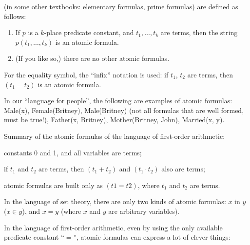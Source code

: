  (in some other textbooks: elementary formulas, prime formulas) are defined as follows:

\begin{enumerate}
    \item If \(p\) is a \(k\)-place predicate constant, and \(t_1, \ldots , t_k\) are terms, then the string \(p(t_1, \ldots , t_k)\) is an atomic formula.
    \item (If you like so,) there are no other atomic formulas.
\end{enumerate}
For the equality symbol, the ``infix'' notation is used: if \(t_1\), \(t_2\) are terms, then \((t_1=t_2)\) is an atomic formula.

\begin{example}
In our ``language for people'', the following are examples of atomic formulas: Male(x), Female(Britney), Male(Britney) (not all formulas that are well formed, must be true!), Father(x, Britney), Mother(Britney, John), Married(x, y).
\end{example}

\begin{example}
Summary of the atomic formulas of the language of first-order arithmetic:

\begin{inparaenum}[(a)]
    \item constants 0 and 1, and all variables are terms;
    \item if \(t_1\) and \(t_2\) are terms, then \((t_1+t_2)\) and \((t_1\cdot t_2)\) also are terms;
    \item atomic formulas are built only as \((t1=t2)\), where \(t_1\) and \(t_2\) are terms.
\end{inparaenum}
\end{example}

\begin{example}
In the language of set theory, there are only two kinds of atomic formulas: \(x\) in \(y\) (\(x\in y\)), and \(x=y\) (where \(x\) and \(y\) are arbitrary variables).
\end{example}
In the language of first-order arithmetic, even by using the only available predicate constant ``\(=\)'', atomic formulas can express a lot of clever things:

